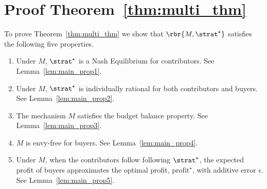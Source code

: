 \section{Proof Theorem~\ref{thm:multi_thm}}
\label{app:main_theorem}
 
To prove Theorem~\ref{thm:multi_thm} we show that $\rbr{M,\strat^{\star}}$ satisfies the following five properties.
\begin{enumerate}
    \item Under $M$, $\strat^\star$ is a Nash Equilibrium for contributors. See Lemma~\ref{lem:main_prop1}.
    
    \item Under $M$, $\strat^\star$ is individually rational for both contributors and buyers. See Lemma~\ref{lem:main_prop2}.
    
    \item The mechanism $M$ satisfies the budget balance property. See Lemma~\ref{lem:main_prop3}.
    
    \item $M$ is envy-free for buyers. See Lemma~\ref{lem:main_prop4}.
    
    
    \item Under $M$, when the contributors follow following $\strat^\star$, the expected profit of buyers approximates the optimal profit, $\mathrm{profit}^{\star}$, with additive error $\epsilon$. See Lemma~\ref{lem:main_prop5}.
\end{enumerate}

